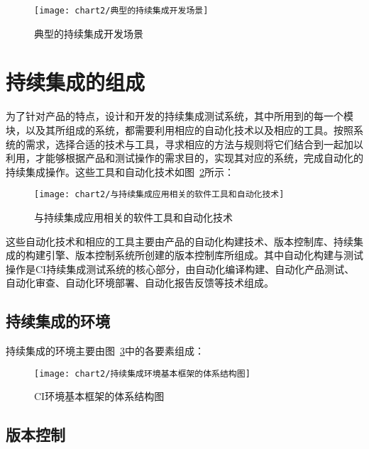 	\begin{figure}[H] %
		\centering
		\texttt{[image: chart2/典型的持续集成开发场景]}
		\caption{典型的持续集成开发场景}
		\label{fig:典型的持续集成开发场景}
	\end{figure}
	
\section{持续集成的组成}

	为了针对产品的特点，设计和开发的持续集成测试系统，其中所用到的每一个模块，以及其所组成的系统，都需要利用相应的自动化技术以及相应的工具。按照系统的需求，选择合适的技术与工具，寻求相应的方法与规则将它们结合到一起加以利用，才能够根据产品和测试操作的需求目的，实现其对应的系统，完成自动化的持续集成操作。这些工具和自动化技术如图~\ref{fig:与持续集成应用相关的软件工具和自动化技术}所示：
	
	\begin{figure}[H] %
		\centering
		\texttt{[image: chart2/与持续集成应用相关的软件工具和自动化技术]}
		\caption{与持续集成应用相关的软件工具和自动化技术}
		\label{fig:与持续集成应用相关的软件工具和自动化技术}
	\end{figure}
	
	这些自动化技术和相应的工具主要由产品的自动化构建技术、版本控制库、持续集成的构建引擎、版本控制系统所创建的版本控制库所组成。其中自动化构建与测试操作是CI持续集成测试系统的核心部分，由自动化编译构建、自动化产品测试、自动化审查、自动化环境部署、自动化报告反馈等技术组成。
	
	\subsection{持续集成的环境}
	
	持续集成的环境主要由图~\ref{fig:持续集成环境基本框架的体系结构图}中的各要素组成：
	
	\begin{figure}[H] %
		\centering
		\texttt{[image: chart2/持续集成环境基本框架的体系结构图]}
		\caption{CI环境基本框架的体系结构图}
		\label{fig:持续集成环境基本框架的体系结构图}
	\end{figure}
	
	\subsection{版本控制}


